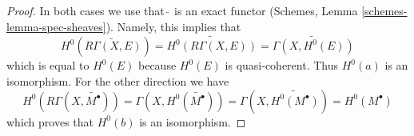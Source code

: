 \begin{proof}
\medskip\noindent
In both cases we use that $\widetilde{\ }$ is an exact functor
(Schemes, Lemma \ref{schemes-lemma-spec-sheaves}). Namely, this
implies that
$$
H^0\left(\widetilde{R\Gamma(X, E)}\right) =
\widetilde{H^0(R\Gamma(X, E))} =
\widetilde{\Gamma(X, H^0(E))}
$$
which is equal to $H^0(E)$ because $H^0(E)$ is quasi-coherent. Thus
$H^0(a)$ is an isomorphism. For the other direction we have
$$
H^0(R\Gamma(X, \widetilde{M^\bullet})) =
\Gamma(X, H^0(\widetilde{M^\bullet})) =
\Gamma(X, \widetilde{H^0(M^\bullet)}) =
H^0(M^\bullet)
$$
which proves that $H^0(b)$ is an isomorphism.
\end{proof}
